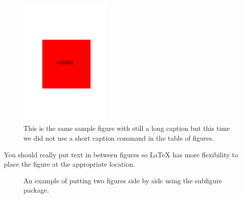 \begin{figure}[ht]
  \begin{center}
    \includegraphics[width=0.4\textwidth]{figure}
    \caption{\label{fig:happy2} This is the same sample figure with still
			a long caption but this time we did not use a short caption command
			in the table of figures.}
  \end{center}
\end{figure}

You should really put text in between figures so LaTeX has more
flexibility to place the figure at the appropriate location.

\begin{figure}
	\centering


	\caption{An example of putting two figures side by side using the subfigure package.}
	\label{ref:ex-ppa-l1-linf}
\end{figure}

